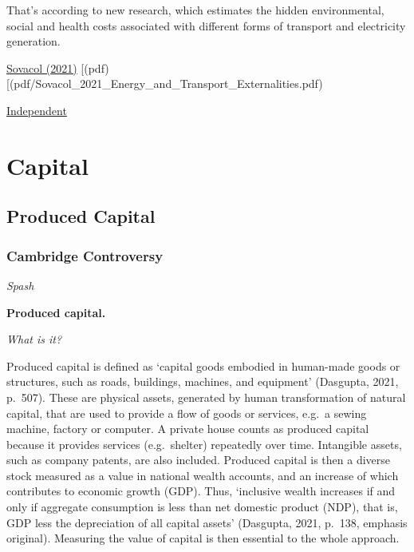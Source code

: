 \documentclass[
]{book}
\begin{document}
That's according to new research, which estimates the hidden environmental, social and health costs associated with different forms of transport and electricity generation.

\href{https://www.sciencedirect.com/science/article/pii/S2214629620304606}{Sovacol (2021)}
{[}(pdf){[}(pdf/Sovacol\_2021\_Energy\_and\_Transport\_Externalities.pdf)

\href{https://www.independent.co.uk/climate-change/news/energy-transport-cost-fossil-fuels-b1805808.html}{Independent}

\hypertarget{capital}{%
\chapter{Capital}\label{capital}}

\hypertarget{produced-capital}{%
\section{Produced Capital}\label{produced-capital}}

\hypertarget{cambridge-controversy}{%
\subsection{Cambridge Controversy}\label{cambridge-controversy}}

\emph{Spash}

\textbf{Produced capital.}

\emph{What is it?}

Produced capital is defined as `capital goods embodied in human-made goods or structures, such as
roads, buildings, machines, and equipment' (Dasgupta, 2021, p.~507). These are physical assets,
generated by human transformation of natural capital, that are used to provide a flow of goods
or services, e.g.~a sewing machine, factory or computer. A private house counts as produced capital
because it provides services (e.g.~shelter) repeatedly over time. Intangible assets, such as company
patents, are also included. Produced capital is then a diverse stock measured as a value in national
wealth accounts, and an increase of which contributes to economic growth (GDP). Thus, `inclusive
wealth increases if and only if aggregate consumption is less than net domestic product (NDP), that
is, GDP less the depreciation of all capital assets' (Dasgupta, 2021, p.~138, emphasis original).
Measuring the value of capital is then essential to the whole approach.
\end{document}
